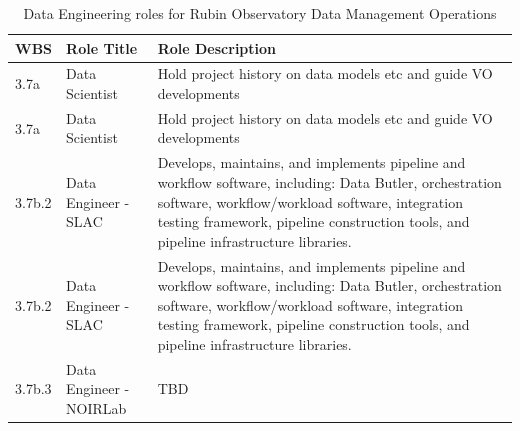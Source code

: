 \normalsize \begin{longtable} {|p{}|p{}|p{}|} \caption{Data Engineering roles for Rubin Observatory Data Management Operations \label{tab:deroles}}\\ 
\hline 
\textbf{WBS}&\textbf{Role Title}&\textbf{Role Description} \\ \hline
{3.7a}&{Data Scientist}&{Hold project history on data models etc and guide VO developments} \\ \hline
{3.7a}&{Data Scientist}&{Hold project history on data models etc and guide VO developments} \\ \hline
{3.7b.2}&{Data Engineer - SLAC}&{Develops, maintains, and implements pipeline and workflow software, including: Data Butler, orchestration software, workflow/workload software, integration testing framework, pipeline construction tools, and pipeline infrastructure libraries.} \\ \hline
{3.7b.2}&{Data Engineer - SLAC}&{Develops, maintains, and implements pipeline and workflow software, including: Data Butler, orchestration software, workflow/workload software, integration testing framework, pipeline construction tools, and pipeline infrastructure libraries.} \\ \hline
{3.7b.3}&{Data Engineer - NOIRLab}&{TBD} \\ \hline
\end{longtable} \normalsize

